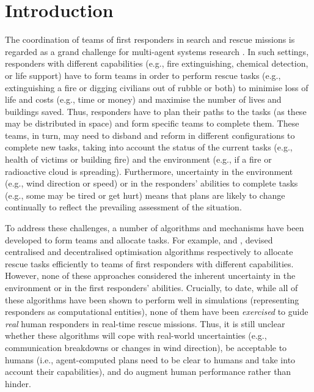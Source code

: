 \section{Introduction}
\noindent The coordination of teams of first responders in search and rescue missions is regarded as  a grand challenge for multi-agent systems research \cite{kitano:2001}. In such settings, responders with different capabilities (e.g., fire extinguishing, chemical detection, or life support) have to form teams in order to perform rescue tasks (e.g., extinguishing a fire or digging civilians out of rubble or both) to minimise  loss of life and costs (e.g., time or money) and maximise the number of lives and buildings saved. Thus, responders have to plan their paths to the tasks (as these may be distributed in space) and form specific teams  to complete them. These teams, in turn, may  need to disband and reform in different configurations to complete new tasks, taking into account the status  of the current tasks  (e.g., health of victims or building fire) and the environment (e.g., if a fire or radioactive cloud is spreading). Furthermore, uncertainty in the environment (e.g., wind direction or speed) or in the responders' abilities to complete tasks (e.g., some may be tired or get hurt) means that plans are likely to change continually to reflect the prevailing assessment of the situation. 

To address these challenges, a number of algorithms and mechanisms have been developed to form teams and allocate tasks. For example, \cite{ramchurn:etal:2010,Scerri2005} and \cite{ramchurn:etal:2010b,Chapman2009}, devised centralised and decentralised optimisation algorithms respectively to allocate rescue tasks efficiently to teams of first responders with different capabilities. However, none of these approaches considered the inherent uncertainty in the environment or in the first responders' abilities. Crucially, to date, while all of these algorithms have been shown to perform well in simulations (representing responders as computational entities), none of them have been \emph{exercised} to guide \emph{real} human responders in real-time rescue missions. Thus, it is still unclear whether these algorithms will cope with real-world uncertainties (e.g., communication breakdowns or changes in wind direction), be acceptable to humans (i.e., agent-computed plans need to be clear to humans and take into account their capabilities), and do augment  human performance rather than hinder.

